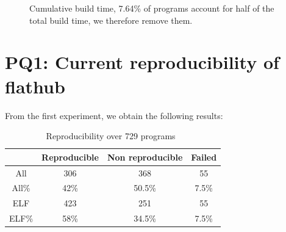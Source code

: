 \documentclass[a4paper,11pt,oneside]{report}
\theoremstyle{definition}
\newcommand{\fh}{flathub\xspace}
\begin{document}
\begin{figure}[h]
    \caption{Cumulative build time, 7.64\% of programs
    account for half of the total build time, we therefore remove them.}
    \label{fig:buildtime}
\end{figure}

\section{PQ1: Current reproducibility of \fh}
\label{sec:cr}
From the first experiment, we obtain the following results:

\begin{table}[h]
    \centering
        \begin{tabular}{|c|c|c|c|}
            \hline
            & Reproducible & Non reproducible & Failed\\
            \hline
            All & 306 & 368 & 55\\
            \hline
            All\% & 42\% & 50.5\% & 7.5\% \\
            \hline
            ELF & 423 & 251 & 55\\
            \hline
            ELF\% & 58\% & 34.5\% & 7.5\% \\
            \hline
        \end{tabular}
    \caption[JSPP]{Reproducibility over 729 programs~\footnotemark}
    \label{tab:rebuild-all}
\end{table}
\end{document}

